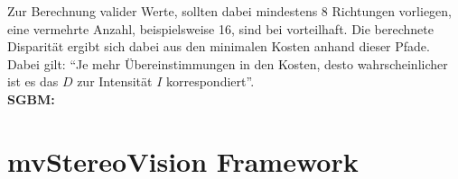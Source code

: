 \noindent
Zur Berechnung valider Werte, sollten dabei mindestens 8 Richtungen vorliegen, eine vermehrte Anzahl, beispielsweise 16, sind bei vorteilhaft. Die berechnete Disparität ergibt sich dabei aus den minimalen Kosten anhand dieser Pfade. Dabei gilt: “Je mehr Übereinstimmungen in den Kosten, desto wahrscheinlicher ist es das $D$ zur Intensität $I$ korrespondiert”.\\

\noindent
\textbf{SGBM:} \\


\section{mvStereoVision Framework}
\label{sec:framework}
